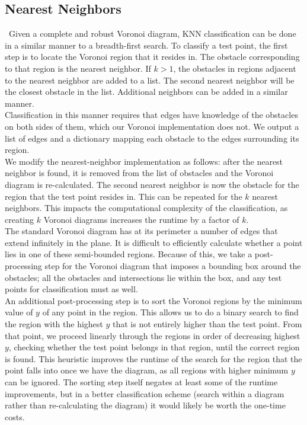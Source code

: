 \documentclass[conference]{IEEEtran}
\begin{document}
\subsection{Nearest Neighbors}\label{knn}
\noindent\ Given a complete and robust Voronoi diagram, KNN classification can be done
in a similar manner to a breadth-first search. To classify a test point, the
first step is to locate the Voronoi region that it resides in. The obstacle
corresponding to that region is the nearest neighbor. If $k>1$, the obstacles
in regions adjacent to the nearest neighbor are added to a list. The second
nearest neighbor will be the closest obstacle in the list. Additional neighbors
can be added in a similar manner.\\
\indent Classification in this manner requires that edges have knowledge of
the obstacles on both sides of them, which our Voronoi implementation does
not. We output a list of edges and a dictionary mapping each obstacle to
the edges surrounding its region.\\
\indent We modify the nearest-neighbor implementation
as follows: after the nearest neighbor is found, it is removed from the list
of obstacles and the Voronoi diagram is re-calculated. The second nearest
neighbor is now the obstacle for the region that the test point resides in.
This can be repeated for the $k$ nearest neighbors. This impacts
the computational complexity of the classification, as creating $k$ Voronoi
diagrams increases the runtime by a factor of $k$.\\
\indent The standard Voronoi diagram has at its perimeter a number of edges
that extend infinitely in the plane. It is difficult to efficiently calculate
whether a point lies in one of these semi-bounded regions. Because of this,
we take a post-processing step for the Voronoi diagram that imposes a bounding
box around the obstacles; all the obstacles and intersections lie within
the box, and any test points for classification must as well.\\
\indent An additional post-processing step is to sort the Voronoi regions
by the minimum value of $y$ of any point in the region. This allows us to
do a binary search to find the region with the highest $y$ that is not
entirely higher than the test point. From that point, we proceed linearly
through the regions in order of decreasing highest $y$, checking whether
the test point belongs in that region, until the correct region is found.
This heuristic improves the runtime
of the search for the region that the point falls into once we have the
diagram, as all regions with higher minimum $y$ can be ignored. The
sorting step itself negates at least some of the runtime improvements, but
in a better classification scheme (search within a diagram rather than
re-calculating the diagram) it would likely be worth the one-time costs.
\end{document}
